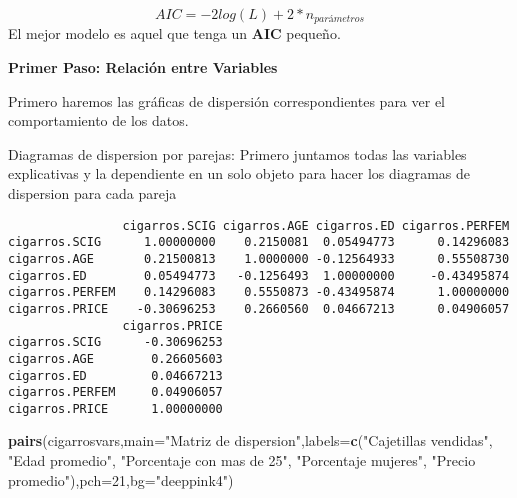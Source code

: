 \documentclass[
  a4paper,
  oneside,
  openany]{book}
\newenvironment{Shaded}{\begin{snugshade}}{\end{snugshade}}
\newcommand{\DataTypeTok}[1]{\textcolor[rgb]{0.13,0.29,0.53}{#1}}
\newcommand{\DecValTok}[1]{\textcolor[rgb]{0.00,0.00,0.81}{#1}}
\newcommand{\KeywordTok}[1]{\textcolor[rgb]{0.13,0.29,0.53}{\textbf{#1}}}
\newcommand{\NormalTok}[1]{#1}
\newcommand{\OperatorTok}[1]{\textcolor[rgb]{0.81,0.36,0.00}{\textbf{#1}}}
\newcommand{\StringTok}[1]{\textcolor[rgb]{0.31,0.60,0.02}{#1}}
\begin{document}
\[AIC=-2log(L) +2* n_{parámetros}\]
El mejor modelo es aquel que tenga un \(\textbf{AIC}\) pequeño.

\textbf{Primer Paso: Relación entre Variables}

Primero haremos las gráficas de dispersión correspondientes para ver el comportamiento de los datos.

Diagramas de dispersion por parejas: Primero juntamos todas las variables explicativas y la dependiente en un solo objeto para hacer los diagramas de dispersion para cada pareja

\begin{Shaded}
\end{Shaded}

\begin{verbatim}
                cigarros.SCIG cigarros.AGE cigarros.ED cigarros.PERFEM
cigarros.SCIG      1.00000000    0.2150081  0.05494773      0.14296083
cigarros.AGE       0.21500813    1.0000000 -0.12564933      0.55508730
cigarros.ED        0.05494773   -0.1256493  1.00000000     -0.43495874
cigarros.PERFEM    0.14296083    0.5550873 -0.43495874      1.00000000
cigarros.PRICE    -0.30696253    0.2660560  0.04667213      0.04906057
                cigarros.PRICE
cigarros.SCIG      -0.30696253
cigarros.AGE        0.26605603
cigarros.ED         0.04667213
cigarros.PERFEM     0.04906057
cigarros.PRICE      1.00000000
\end{verbatim}

\begin{Shaded}
\begin{Highlighting}[]
\KeywordTok{pairs}\NormalTok{(cigarrosvars,}\DataTypeTok{main=}\StringTok{"Matriz de dispersion"}\NormalTok{,}\DataTypeTok{labels=}\KeywordTok{c}\NormalTok{(}\StringTok{"Cajetillas vendidas"}\NormalTok{, }\StringTok{"Edad promedio"}\NormalTok{, }\StringTok{"Porcentaje con mas de 25"}\NormalTok{, }\StringTok{"Porcentaje mujeres"}\NormalTok{, }\StringTok{"Precio promedio"}\NormalTok{),}\DataTypeTok{pch=}\DecValTok{21}\NormalTok{,}\DataTypeTok{bg=}\StringTok{"deeppink4"}\NormalTok{)}
\end{Highlighting}
\end{Shaded}
\end{document}
